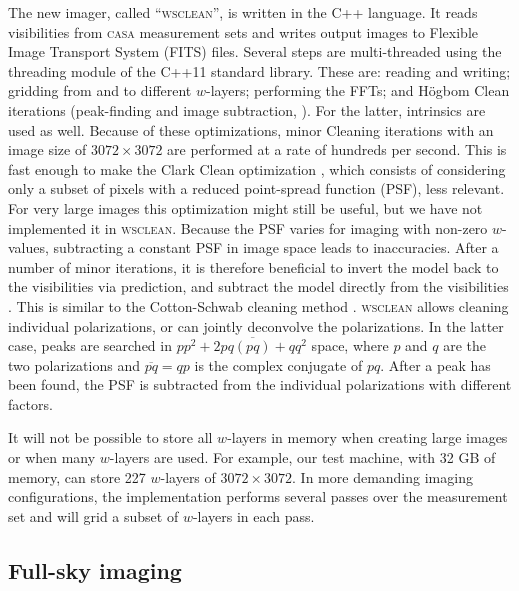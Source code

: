 \documentclass[useAMS,usenatbib]{mn2e}
\begin{document}
The new imager, called ``\textsc{wsclean}'', is written in the C++ language. It reads visibilities from \textsc{casa} measurement sets and writes output images to Flexible Image Transport System (FITS) files. Several steps are multi-threaded using the threading module of the C++11 standard library. These are: reading and writing; gridding from and to different $w$-layers; performing the FFTs; and H\"ogbom Clean iterations (peak-finding and image subtraction, \citealt{hogbom-clean}). For the latter, intrinsics are used as well. Because of these optimizations, minor Cleaning iterations with an image size of $3072\times3072$ are performed at a rate of hundreds per second. This is fast enough to make the Clark Clean optimization \citep{clark-clean}, which consists of considering only a subset of pixels with a reduced point-spread function (PSF), less relevant. For very large images this optimization might still be useful, but we have not implemented it in \textsc{wsclean}. Because the PSF varies for imaging with non-zero $w$-values, subtracting a constant PSF in image space leads to inaccuracies. After a number of minor iterations, it is therefore beneficial to invert the model back to the visibilities via prediction, and subtract the model directly from the visibilities \citep{wprojection-cornwell}. This is similar to the Cotton-Schwab cleaning method \citep{cotton-schwab-clean}. \textsc{wsclean} allows cleaning individual polarizations, or can jointly deconvolve the polarizations. In the latter case, peaks are searched in $pp^2+2pq \overline{(pq)} + qq^2$ space, where $p$ and $q$ are the two polarizations and $\overline{pq}=qp$ is the complex conjugate of $pq$. After a peak has been found, the PSF is subtracted from the individual polarizations with different factors.

It will not be possible to store all $w$-layers in memory when creating large images or when many $w$-layers are used. For example, our test machine, with 32 GB of memory, can store 227 $w$-layers of $3072\times3072$. In more demanding imaging configurations, the implementation performs several passes over the measurement set and will grid a subset of $w$-layers in each pass.

\subsection{Full-sky imaging}
\end{document}
